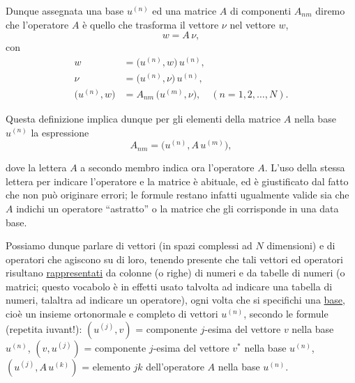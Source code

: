 \documentclass[11pt, a4paper]{book}
\numberwithin{equation}{section}
\begin{document}
Dunque assegnata una base $u^{(n)}$ ed una matrice $A$ di componenti
$A_{nm}$ diremo che l'operatore $A$ è quello che trasforma il vettore $\nu$
nel vettore $w$,
\begin{equation}
w = A\,\nu,
\end{equation}
con
\begin{align}
w &= \bigl(u^{(n)}, w\bigr)\,u^{(n)}, \tag{6} \\
\nu &= \bigl(u^{(n)}, \nu\bigr)\,u^{(n)}, \tag{7} \\
\bigl(u^{(n)}, w\bigr) &= A_{nm}\,\bigl(u^{(m)}, \nu\bigr),
  \quad (n = 1,2,\ldots,N). \tag{8}
\end{align}

Questa definizione implica dunque per gli elementi della matrice $A$ nella
base $u^{(n)}$ la espressione
\begin{equation}
A_{nm} = \bigl(u^{(n)}, A\,u^{(m)}\bigr),
\end{equation}


dove la lettera $A$ a secondo membro indica ora l'operatore $A$. L'uso
della stessa lettera per indicare l'operatore e la matrice è abituale, ed è
giustificato dal fatto che non può originare errori; le formule restano
infatti ugualmente valide sia che $A$ indichi un operatore ``astratto'' o
la matrice che gli corrisponde in una data base.

Possiamo dunque parlare di vettori (in spazi complessi ad $N$ dimensioni)
e di operatori che agiscono su di loro, tenendo presente che tali vettori
ed operatori risultano \underline{rappresentati} da colonne (o righe) di
numeri e da tabelle di numeri (o matrici; questo vocabolo è in effetti usato
talvolta ad indicare una tabella di numeri, talaltra ad indicare un
operatore), ogni volta che si specifichi una \underline{base}, cioè un
insieme ortonormale e completo di vettori $u^{(n)}$, secondo le formule
(repetita iuvant!): $(u^{(j)},v)$ = componente $j$-esima del vettore $v$
nella base $u^{(n)}$, $(v, u^{(j)})$ = componente $j$-esima del vettore
$v^*$ nella base $u^{(n)}$, $(u^{(j)}, A\,u^{(k)})$ = elemento $jk$
dell'operatore $A$ nella base $u^{(n)}$.
\end{document}
